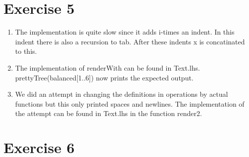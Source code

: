 \documentclass{article}
\begin{document}
\section*{Exercise 5}
\begin{enumerate}
  \item The implementation is quite slow since it adds i-times an indent. In this indent there is also a recursion to tab.  After these indents x is concatinated to this.
  \item The implementation of renderWith can be found in Text.lhs. prettyTree(balanced[1..6]) now prints the expected output.
  \item We did an attempt in changing the definitions in operations by actual functions but this only printed spaces and newlines. The implementation of the attempt can be found in Text.lhs in the function render2. 
\end{enumerate}

\section*{Exercise 6}
\end{document}
